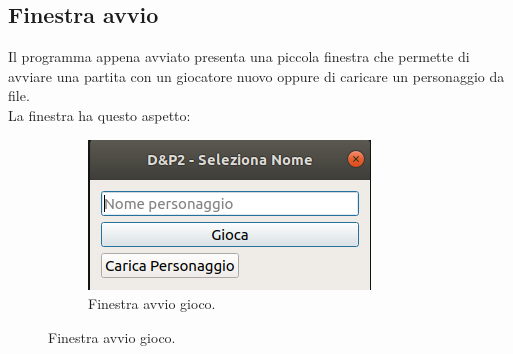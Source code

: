 \documentclass[../relazione.tex]{subfiles}
\begin{document}
\subsection{Finestra avvio}
\label{ssec:finestra-avvio}
Il programma appena avviato presenta una piccola finestra che permette di avviare una partita con un giocatore nuovo oppure di caricare un personaggio da file.\\
La finestra ha questo aspetto:
\begin{figure}[h]
    \centering
    \begin{subfigure}[b]{0.4\linewidth}
        \includegraphics[width=\linewidth]{img/start_game.png}
        \caption{Finestra avvio gioco.}
    \end{subfigure}
    \label{fig:start-game}
\end{figure}
\newpage{}
\end{document}
